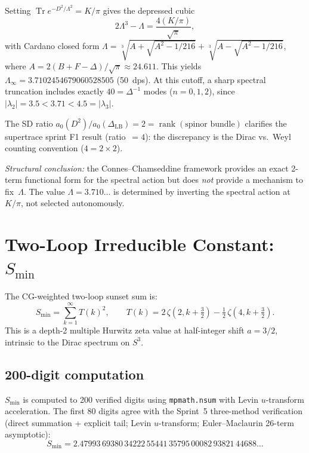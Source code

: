 \documentclass[11pt]{article}
\begin{document}
Setting $\operatorname{Tr} e^{-D^2/\Lambda^2} = K/\pi$ gives the
depressed cubic
\begin{equation}
  2\Lambda^3 - \Lambda = \frac{4(K/\pi)}{\sqrt{\pi}},
  \label{eq:depressed_cubic}
\end{equation}
with Cardano closed form
$\Lambda = \sqrt[3]{A + \sqrt{A^2 - 1/216}}
         + \sqrt[3]{A - \sqrt{A^2 - 1/216}}$,
where $A = 2(B + F - \Delta)/\sqrt{\pi} \approx 24.611$.  This yields
$\Lambda_{\infty} = 3.7102454679060528505$ (50~dps).  At this cutoff,
a sharp spectral truncation includes exactly
$40 = \Delta^{-1}$ modes ($n = 0, 1, 2$), since
$|\lambda_2| = 3.5 < 3.71 < 4.5 = |\lambda_3|$.

The SD ratio $a_0(D^2)/a_0(\Delta_{\mathrm{LB}}) = 2 = \operatorname{rank}(\text{spinor bundle})$
clarifies the supertrace sprint F1 result (ratio~$= 4$): the
discrepancy is the Dirac vs.\ Weyl counting convention ($4 = 2 \times 2$).

\emph{Structural conclusion:} the Connes--Chamseddine framework
provides an exact 2-term functional form for the spectral action but
does \emph{not} provide a mechanism to fix~$\Lambda$.  The value
$\Lambda = 3.710\ldots$ is determined by inverting the spectral
action at $K/\pi$, not selected autonomously.

\section{Two-Loop Irreducible Constant: $S_{\min}$}
\label{sec:smin}

The CG-weighted two-loop sunset sum is:
\begin{equation}
  S_{\min} = \sum_{k=1}^{\infty} T(k)^2, \qquad
  T(k) = 2\,\zeta(2, k + \tfrac{3}{2})
       - \tfrac{1}{2}\,\zeta(4, k + \tfrac{3}{2}).
  \label{eq:S_min}
\end{equation}
This is a depth-2 multiple Hurwitz zeta value at half-integer shift
$a = 3/2$, intrinsic to the Dirac spectrum on $S^3$.

\subsection{200-digit computation}

$S_{\min}$ is computed to 200 verified digits using
\texttt{mpmath.nsum} with Levin $u$-transform acceleration.
The first 80 digits agree with the Sprint~5 three-method verification
(direct summation + explicit tail; Levin $u$-transform; Euler--Maclaurin
26-term asymptotic):
\begin{equation}
  S_{\min} = 2.47993\,69380\,34222\,55441\,35795\,00082\,93821\,44688\ldots
  \label{eq:S_min_value}
\end{equation}
\end{document}
